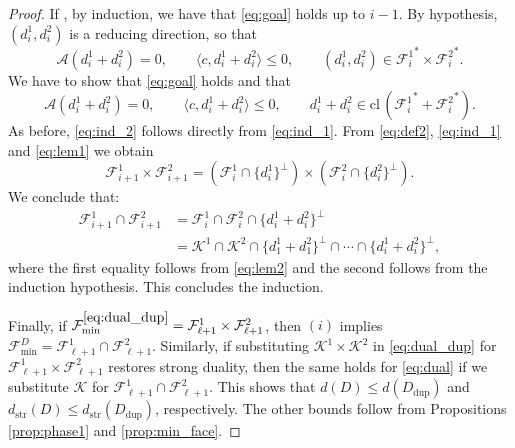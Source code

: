 \documentclass{article}
\newcommand{\closure}{\mathrm{cl}\,}
\newcommand{\inProd}[2]{\langle #1 , #2 \rangle }
\newcommand{\minFaceD}{ {\mathcal{F}_{\min}^D}}
\newcommand{\minFace}[1]{ {\mathcal{F}_{\min}^{#1}}}
\newcommand{\stdMap}{ {\mathcal{A}}}
\newcommand{\stdCone}{ {\mathcal{K}}}
\newcommand{\stdFace}{ \mathcal{F}}
\newcommand{\distS}{d _{\text{str}}}
\begin{document}
\begin{proof}
If , by induction, we have that \eqref{eq:goal} holds up to $i - 1$. By hypothesis, $(d_i^1,d_i^2)$ is a reducing direction, so 
that  
\begin{equation}
\stdMap (d_i ^1 + d_i ^2) = 0, \qquad \inProd{c}{d_i ^1 + d_i ^2} \leq 0 , \qquad (d_i^1,d_i^2) \in {\stdFace _i^1}^* \times {\stdFace _i^2}^*. \label{eq:ind_1}
\end{equation}
We have to show that \eqref{eq:goal} holds and that
\begin{equation}
\stdMap (d_i ^1 + d_i ^2) = 0, \qquad \inProd{c}{d_i ^1 + d_i ^2} \leq 0 , \qquad d_i^1 + d_i^2 \in \closure({\stdFace _i^1}^*+{\stdFace _i^2}^*). \label{eq:ind_2}
\end{equation}
As before, \eqref{eq:ind_2} follows directly from \eqref{eq:ind_1}.
From \eqref{eq:def2}, \eqref{eq:ind_1} and \eqref{eq:lem1} we obtain
$$\stdFace _{i+1}^1 \times \stdFace _{i + 1}^2 = 
(\stdFace^1 _i \cap \{d_i^1 \}^\perp) \times(\stdFace^2 _i \cap \{d_i^2 \}^\perp). $$
We conclude that:
\begin{align*}
\stdFace _{i+1}^1 \cap  \stdFace _{i + 1}^2 & = \stdFace^1  _i \cap \stdFace^2 _i \cap \{d_i^1 + d_i^2 \}^\perp \\
& =  \stdCone^1 \cap \stdCone^2 \cap \{d_1^1+d_1^2\}^\perp \cap \cdots \cap \{d_i^1+d_i^2\}^\perp,
\end{align*}
where the first equality follows from \eqref{eq:lem2} and the second follows from the induction hypothesis. This concludes the induction.



Finally, if $\minFace{\eqref{eq:dual_dup}}  = \stdFace ^1_{\ell+1} \times \stdFace ^2 _{\ell+1}$, 
then $(i)$  implies $\minFaceD =  \stdFace ^1_{\ell+1} \cap \stdFace ^2 _{\ell+1}$.
Similarly, if substituting $\stdCone ^1 \times \stdCone ^2$ in \eqref{eq:dual_dup} for 
$\stdFace ^1_{\ell+1} \times \stdFace ^2_{\ell+1} $ restores strong duality, then the same holds 
for \eqref{eq:dual} if we substitute $\stdCone$ for $\stdFace ^1_{\ell+1} \cap \stdFace ^2 _{\ell+1}$.
This shows that $	d(D) \leq  d(D_{\text{dup}})$ and  $\distS(D) \leq  \distS(D_{\text{dup}})$, respectively. The other bounds  follow from Propositions \ref{prop:phase1} and \ref{prop:min_face}.
\end{proof}
%
\end{document}
